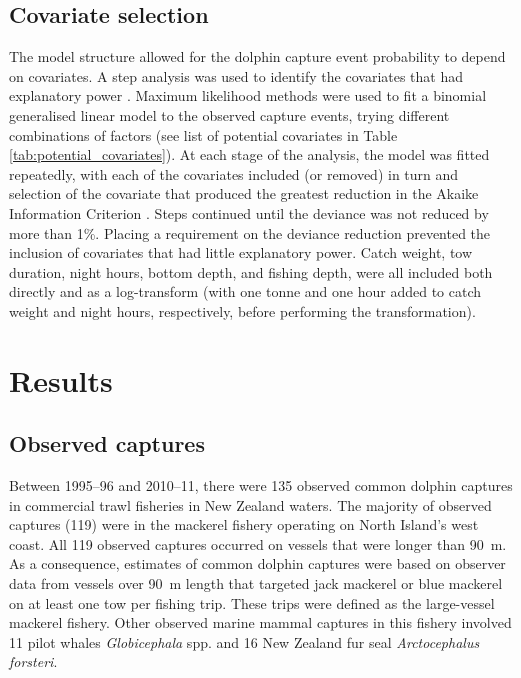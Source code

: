 \documentclass[10pt]{article}
\begin{document}
\subsection*{Covariate selection}
The model structure allowed for the dolphin capture event probability to depend
on covariates. A step analysis was used to identify the covariates that had explanatory power \cite{venables_modern_2002}. Maximum likelihood methods were used to fit a binomial generalised linear model to the observed capture events, trying different combinations of factors (see list of potential covariates in Table \ref{tab:potential_covariates}).  At each stage of the analysis, the model was fitted repeatedly, with each of the covariates included (or removed) in turn and selection of the covariate that produced the greatest reduction in the Akaike
Information Criterion \cite{akaike_information_1974}.  Steps continued until the deviance was not reduced by more than 1\%. Placing a requirement on the deviance reduction prevented the inclusion of covariates that had little explanatory power. Catch weight, tow duration, night hours, bottom depth, and fishing depth, were all included both directly and as a log-transform (with one tonne and one hour added to catch weight and night hours, respectively, before performing the transformation). 

\section*{Results}
\subsection*{Observed captures}

Between \mbox{1995--96} and \mbox{2010--11}, there were 135 observed common dolphin captures in commercial trawl fisheries in New Zealand waters.  The majority of observed captures (119) were in the mackerel fishery operating on North Island's west coast.  All 119 observed captures occurred on vessels that were longer than 90~m. As a consequence, estimates of common dolphin captures were based on
observer data from vessels over 90~m length that targeted jack
mackerel or blue mackerel on at least one tow per fishing trip. These trips were defined as the large-vessel mackerel fishery. Other observed marine mammal captures in this fishery involved 11 pilot whales \emph{Globicephala} spp. and 16 New Zealand fur seal \emph{Arctocephalus forsteri}.
\end{document}
